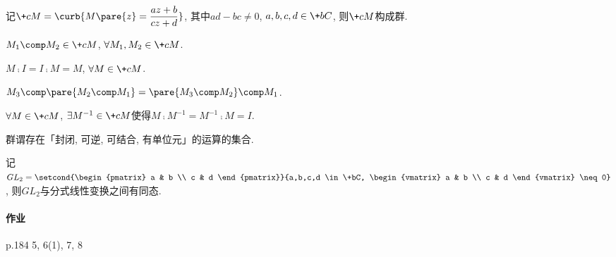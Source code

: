 \documentclass[../ComplexVariable.tex]{subfiles}
\begin{document}
\begin{theorem}
    记$\displaystyle \+cM = \curb{M\pare{z} = \frac{az+b}{cz+d}}$, 其中$ad-bc\neq 0$, $a,b,c,d\in \+bC$, 则$\+cM$构成群.
    \begin{cenum}
        \item $M_1\comp M_2 \in \+cM$, $\forall M_1,M_2\in \+cM$.
        \item $M\comp I = I\comp M = M$, $\forall M\in \+cM$.
        \item $M_3 \comp \pare{M_2\comp M_1} = \pare{M_3 \comp M_2} \comp M_1$.
        \item $\forall M\in \+cM$, $\exists M^{-1}\in \+cM$使得$M\comp M^{-1} = M^{-1}\comp M = I$.
    \end{cenum}
\end{theorem}
\begin{remark}
    群谓存在「封闭, 可逆, 可结合, 有单位元」的运算的集合.
\end{remark}
\begin{ex}
    记$GL_2 = \displaystyle \setcond{\begin{pmatrix}
        a & b \\
        c & d
    \end{pmatrix}}{a,b,c,d \in \+bC, \begin{vmatrix}
        a & b \\
        c & d
    \end{vmatrix} \neq 0}$, 则$GL_2$与分式线性变换之间有同态.
\end{ex}

\paragraph{作业} %
\label{par:作业}

p.184 5, 6(1), 7, 8

\end{document}
